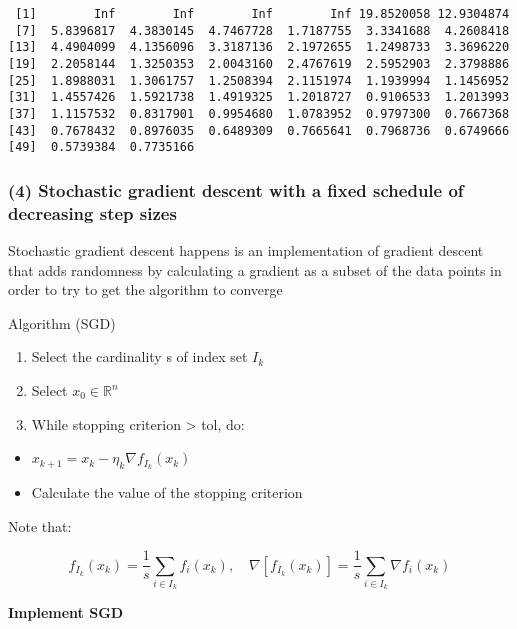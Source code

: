 \documentclass[
  letterpaper,
  DIV=11,
  numbers=noendperiod]{scrartcl}
\providecommand{\tightlist}{%
  \setlength{\itemsep}{0pt}\setlength{\parskip}{0pt}}\usepackage{longtable,booktabs,array}
\begin{document}
\begin{verbatim}
 [1]        Inf        Inf        Inf        Inf 19.8520058 12.9304874
 [7]  5.8396817  4.3830145  4.7467728  1.7187755  3.3341688  4.2608418
[13]  4.4904099  4.1356096  3.3187136  2.1972655  1.2498733  3.3696220
[19]  2.2058144  1.3250353  2.0043160  2.4767619  2.5952903  2.3798886
[25]  1.8988031  1.3061757  1.2508394  2.1151974  1.1939994  1.1456952
[31]  1.4557426  1.5921738  1.4919325  1.2018727  0.9106533  1.2013993
[37]  1.1157532  0.8317901  0.9954680  1.0783952  0.9797300  0.7667368
[43]  0.7678432  0.8976035  0.6489309  0.7665641  0.7968736  0.6749666
[49]  0.5739384  0.7735166
\end{verbatim}

\subsubsection{(4) Stochastic gradient descent with a fixed schedule of
decreasing step
sizes}\label{stochastic-gradient-descent-with-a-fixed-schedule-of-decreasing-step-sizes}

Stochastic gradient descent happens is an implementation of gradient
descent that adds randomness by calculating a gradient as a subset of
the data points in order to try to get the algorithm to converge

Algorithm (SGD)

\begin{enumerate}
\def\labelenumi{\arabic{enumi}.}
\tightlist
\item
  Select the cardinality s of index set \(I_k\)
\item
  Select \(x_0∈\mathbb{R}^n\)
\item
  While stopping criterion \textgreater{} tol, do:
\end{enumerate}

\begin{itemize}
\tightlist
\item
  \(x_{k+1} = x_k - \eta_{k}\nabla f_{I_k}(x_k)\)
\item
  Calculate the value of the stopping criterion
\end{itemize}

Note that:

\[
f_{I_k}(x_k) = \frac{1}{s} \sum_{i∈I_k} f_i(x_k), \quad \nabla{[f_{I_k}(x_k)]} = \frac{1}{s} \sum_{i∈I_k} \nabla f_i(x_k)
\]

\textbf{Implement SGD}
\end{document}
